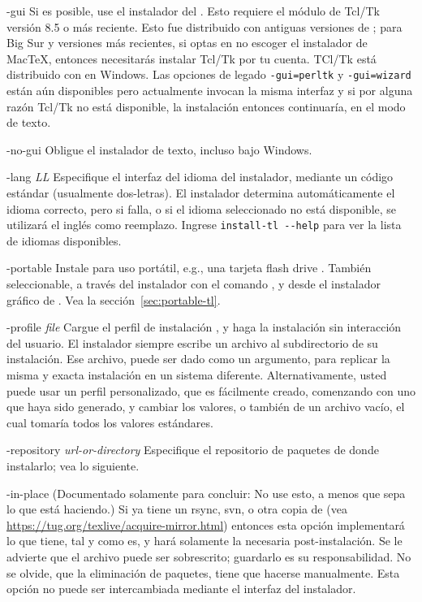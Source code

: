 \documentclass{article}
\begin{document}
\begin{ttdescription}
\item[-gui] Si es posible, use el instalador del \GUI{}. Esto requiere
	el módulo de Tcl/Tk versión 8.5 o más reciente.  Esto fue
	distribuido con antiguas versiones de \macOS; para Big Sur
	y versiones más recientes, si optas en no escoger el instalador de
	Mac\TeX{}, entonces necesitarás instalar Tcl/Tk por tu
	cuenta. TCl/Tk está distribuido con \TL{} en Windows.	Las
	opciones de legado \texttt{-gui=perltk} y \texttt{-gui=wizard}
	están aún disponibles pero actualmente invocan la misma
	interfaz \GUI{} y si por alguna razón Tcl/Tk no está
	disponible, la instalación entonces continuaría, en el modo
	de texto.

\item[-no-gui] Obligue el instalador de texto, incluso bajo Windows. 

\item[-lang {\sl LL}] Especifique el interfaz del idioma del
	instalador, mediante un código estándar (usualmente
	dos-letras). El instalador determina automáticamente el idioma
	correcto, pero si falla, o si el idioma seleccionado no está
	disponible, se utilizará el inglés como reemplazo. Ingrese
	\verb|install-tl --help| para ver la lista de idiomas
	disponibles.

\item[-portable] Instale para uso portátil, e.g., una tarjeta flash
	drive \USB{}. También seleccionable, a través del instalador
	con el comando , y desde el instalador gráfico de
	\GUI{}. Vea la sección~\ref{sec:portable-tl}.

\item[-profile {\sl file}] Cargue el perfil de instalación ,
	y haga la instalación sin interacción del usuario. El
	instalador siempre escribe un archivo
	 al subdirectorio  de
	su instalación. Ese archivo, puede ser dado como un argumento,
	para replicar la misma y exacta instalación en un sistema
	diferente. Alternativamente, usted puede usar un perfil
	personalizado, que es fácilmente creado, comenzando con uno
	que haya sido generado, y cambiar los valores, o también de un
	archivo vacío, el cual tomaría todos los valores estándares.

\item[-repository {\sl url-or-directory}] Especifique el repositorio
	de paquetes de donde instalarlo; vea lo siguiente.


\item[-in-place] (Documentado solamente para concluir: No use esto, a
	menos que sepa lo que está haciendo.) Si ya tiene un rsync,
	svn, o otra copia de \TL{} (vea
	\url{https://tug.org/texlive/acquire-mirror.html}) entonces
	esta opción implementará lo que tiene, tal y como es, y hará
	solamente la necesaria post-instalación. Se le advierte que el
	archivo  puede ser sobrescrito;
	guardarlo es su responsabilidad. No se olvide, que la
	eliminación de paquetes, tiene que hacerse manualmente. Esta
	opción no puede ser intercambiada mediante el interfaz del
	instalador. 
\end{ttdescription}
\end{document}
